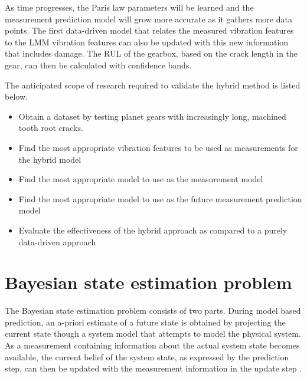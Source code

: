 As time progresses, the Paris law parameters will be learned and the measurement prediction model will grow more accurate as it gathers more data points. The first data-driven model that relates the measured vibration features to the LMM vibration features can also be updated with this new information that includes damage. The RUL of the gearbox, based on the crack length in the gear, can then be calculated with confidence bands.

The anticipated scope of research required to validate the hybrid method is listed below.
\begin{itemize}
	\item Obtain a dataset by testing planet gears with increasingly long, machined tooth root cracks.
	\item Find the most appropriate vibration features to be used as measurements for the hybrid model
	\item Find the most appropriate model to use as the measurement model
	\item Find the most appropriate model to use as the future measurement prediction model
	\item Evaluate the effectiveness of the hybrid approach as compared to a purely data-driven approach
\end{itemize}






\section{Bayesian state estimation problem}

The Bayesian state estimation problem consists of two parts. During model based prediction, an a-priori estimate of a future state is obtained by projecting the current state though a system model that attempts to model the physical system. As a measurement containing information about the actual system state becomes available, the current belief of the system state, as expressed by the prediction step, can then be updated with the measurement information in the update step \citep{Fang2018}. 

